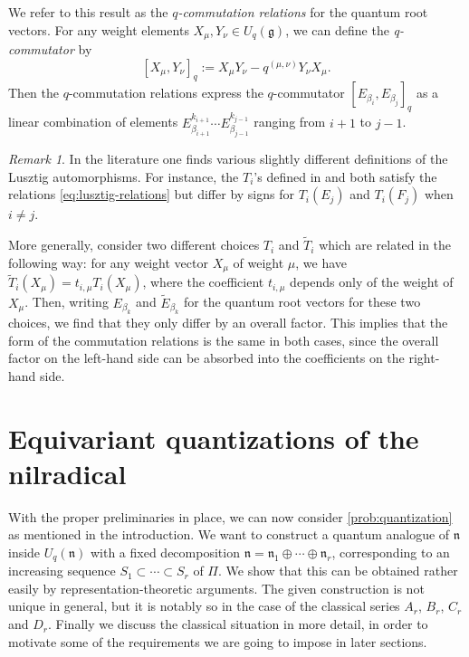 \documentclass[a4paper, 12pt, reqno, english]{amsart}
\numberwithin{equation}{section}
\numberwithin{figure}{section}
\theoremstyle{plain}
\theoremstyle{plain}
\theoremstyle{plain}
\theoremstyle{plain}
\theoremstyle{plain}
\theoremstyle{definition}
\theoremstyle{definition}
\theoremstyle{definition}
\theoremstyle{remark}
\newtheorem{remark}[theorem]{Remark}
\theoremstyle{definition}
\theoremstyle{definition}
\newcommand{\Uqg}{U_q(\mathfrak{g})}
\newcommand{\Uqn}{U_q(\mathfrak{n})}
\newcommand{\lien}{\mathfrak{n}}
\newcommand{\simpleroots}{\Pi}
\begin{document}
We refer to this result as the \emph{$q$-commutation relations} for the quantum root vectors.
For any weight elements $X_\mu, Y_\nu \in \Uqg$, we can define the \emph{q-commutator} by
\[
[X_\mu, Y_\nu]_q := X_\mu Y_\nu - q^{(\mu, \nu)} Y_\nu X_\mu.
\]
Then the $q$-commutation relations express the $q$-commutator $[E_{\beta_i}, E_{\beta_j}]_q$ as a linear combination of elements $E_{\beta_{i + 1}}^{k_{i + 1}} \cdots E_{\beta_{j - 1}}^{k_{j - 1}}$ ranging from $i + 1$ to $j - 1$.

\begin{remark}
\label{rem:lusztig-automorphisms}
In the literature one finds various slightly different definitions of the Lusztig automorphisms. For instance, the $T_i$'s defined in \cite[Section 8.14]{jantzen} and \cite[Section I.6.7]{brown-goodearl} both satisfy the relations \eqref{eq:lusztig-relations} but differ by signs for $T_i(E_j)$ and $T_i(F_j)$ when $i \neq j$.

More generally, consider two different choices $T_i$ and $\tilde{T}_i$ which are related in the following way: for any weight vector $X_\mu$ of weight $\mu$, we have $\tilde{T}_i(X_\mu) = t_{i, \mu} T_i(X_\mu)$, where the coefficient $t_{i, \mu}$ depends only of the weight of $X_\mu$.
Then, writing $E_{\beta_k}$ and $\tilde{E}_{\beta_k}$ for the quantum root vectors for these two choices, we find that they only differ by an overall factor.
This implies that the form of the commutation relations is the same in both cases, since the overall factor on the left-hand side can be absorbed into the coefficients on the right-hand side.
\end{remark}

\section{Equivariant quantizations of the nilradical}
\label{sec:equivariant-quantizations}

With the proper preliminaries in place, we can now consider \cref{prob:quantization} as mentioned in the introduction.
We want to construct a quantum analogue of $\lien$ inside $\Uqn$ with a fixed decomposition $\lien = \lien_1 \oplus \cdots \oplus \lien_r$, corresponding to an increasing sequence $S_1 \subset \cdots \subset S_r$ of $\simpleroots$.
We show that this can be obtained rather easily by representation-theoretic arguments.
The given construction is not unique in general, but it is notably so in the case of the classical series $A_r$, $B_r$, $C_r$ and $D_r$.
Finally we discuss the classical situation in more detail, in order to motivate some of the requirements we are going to impose in later sections.
\end{document}
